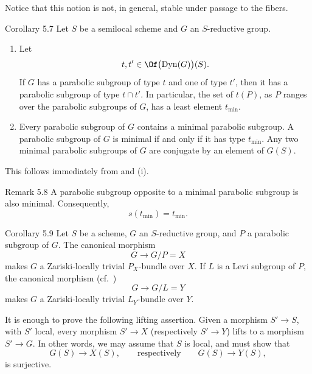 Notice that this notion is not, in general, stable under passage to
the fibers.

\begin{sgastatement}{Corollary 5.7}
Let \(S\) be a semilocal scheme and \(G\) an \(S\)-reductive group.
\begin{enumerate}[label=\textup{(\roman*)}]
\item Let
\[
 t,t'\in\Of\bigl(\operatorname{Dyn}(G)\bigr)(S).
\]
If \(G\) has a parabolic subgroup of type \(t\) and one of type
\(t'\), then it has a parabolic subgroup of type \(t\cap t'\).  In
particular, the set of \(t(P)\), as \(P\) ranges over the parabolic
subgroups of \(G\), has a least element \(t_{\min}\).
\item Every parabolic subgroup of \(G\) contains a minimal parabolic
subgroup.  A parabolic subgroup of \(G\) is minimal if and only if it
has type \(t_{\min}\).  Any two minimal parabolic subgroups of \(G\)
are conjugate by an element of \(G(S)\).
\end{enumerate}
\end{sgastatement}

This follows immediately from  and \textup{(i)}.

\begin{sgastatement}{Remark 5.8}
A parabolic subgroup opposite to a minimal parabolic subgroup is
also minimal.  Consequently,
\[
 s(t_{\min})=t_{\min}.
\]
\end{sgastatement}

\begin{sgastatement}{Corollary 5.9}
Let \(S\) be a scheme, \(G\) an \(S\)-reductive group, and \(P\) a
parabolic subgroup of \(G\).  The canonical morphism
\[
 G\longrightarrow G/P=X
\]
makes \(G\) a Zariski-locally trivial \(P_X\)-bundle over \(X\).
If \(L\) is a Levi subgroup of \(P\), the canonical morphism
\textup{(cf.\ )}
\[
 G\longrightarrow G/L=Y
\]
makes \(G\) a Zariski-locally trivial \(L_Y\)-bundle over \(Y\).
\end{sgastatement}

It is enough to prove the following lifting assertion.  Given a
morphism \(S'\to S\), with \(S'\) local, every morphism \(S'\to X\)
\textup{(respectively \(S'\to Y\))} lifts to a morphism \(S'\to G\).
In other words, we may assume that \(S\) is local, and must show that
\[
 G(S)\longrightarrow X(S),
 \qquad\text{respectively}\qquad
 G(S)\longrightarrow Y(S),
\]
is surjective.

